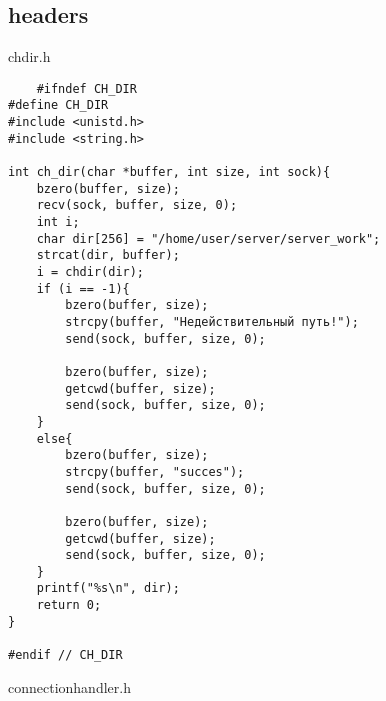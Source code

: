 \documentclass[12pt,a4paper]{report}
\begin{document}
\subsection*{headers}
chdir.h
\begin{lstlisting}
	#ifndef CH_DIR
#define CH_DIR
#include <unistd.h>
#include <string.h>

int ch_dir(char *buffer, int size, int sock){
    bzero(buffer, size);
    recv(sock, buffer, size, 0);
    int i;
    char dir[256] = "/home/user/server/server_work";
    strcat(dir, buffer);
    i = chdir(dir);
    if (i == -1){
        bzero(buffer, size);
        strcpy(buffer, "Недействительный путь!");
        send(sock, buffer, size, 0);

        bzero(buffer, size);
        getcwd(buffer, size);
        send(sock, buffer, size, 0);
    }
    else{
        bzero(buffer, size);
        strcpy(buffer, "succes");
        send(sock, buffer, size, 0);

        bzero(buffer, size);
        getcwd(buffer, size);
        send(sock, buffer, size, 0);
    }
    printf("%s\n", dir);
    return 0;
}

#endif // CH_DIR
\end{lstlisting}
connectionhandler.h
\end{document}
